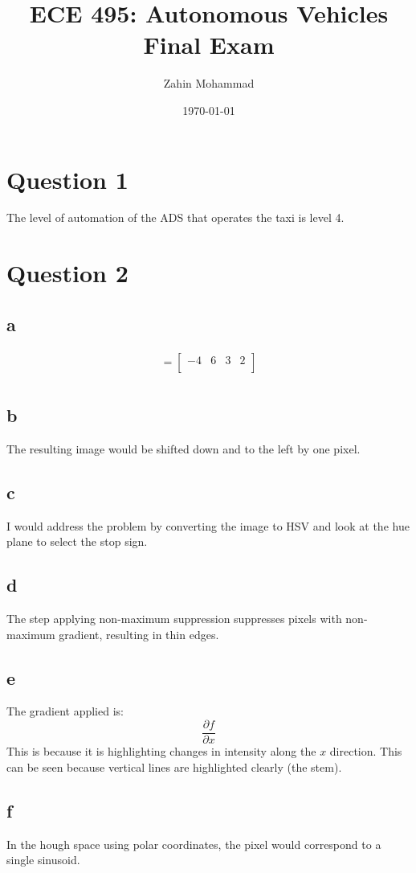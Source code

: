 \documentclass[12pt]{article}
\title{ECE 495: Autonomous Vehicles\\Final Exam}
\author{Zahin Mohammad}
\date{\today}
\begin{document}
\maketitle
\section{Question 1}
The level of automation of the ADS that operates the taxi is level 4.
\section{Question 2}
\subsection{a}
\begin{align*}
    = \begin{bmatrix}
        -4 & 6 & 3 & 2 \\
    \end{bmatrix} \\
\end{align*}
\subsection{b}
The resulting image would be shifted down and to the left by one pixel.
\subsection{c}
I would address the problem by converting the image to HSV and look at the hue plane to select the stop sign.
\subsection{d}
The step applying non-maximum suppression suppresses pixels with non-maximum gradient, resulting in thin edges.
\subsection{e}
The gradient applied is:
\begin{equation*}
    \frac{\partial{f}}{\partial{x}}
\end{equation*}
This is because it is highlighting changes in intensity along the $x$ direction.
This can be seen because vertical lines are highlighted clearly (the stem).
\subsection{f}
In the hough space using polar coordinates, the pixel would correspond to a single sinusoid.
\end{document}
